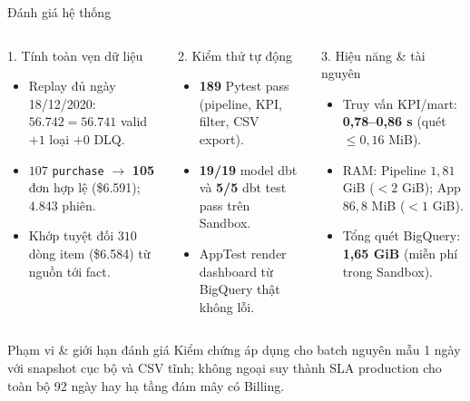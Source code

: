 \documentclass[aspectratio=169]{beamer}
\begin{document}
\begin{frame}{Đánh giá hệ thống}
  \small
  \begin{columns}[T,onlytextwidth]
    \begin{block}{1. Tính toàn vẹn dữ liệu}
      \scriptsize
      \begin{itemize}
        \item Replay đủ ngày 18/12/2020: $56.742 = 56.741$ valid $+ 1$ loại $+ 0$ DLQ.
        \item $107$ \texttt{purchase} $\rightarrow$ \textbf{105} đơn hợp lệ (\$6.591); $4.843$ phiên.
        \item Khớp tuyệt đối $310$ dòng item (\$6.584) từ nguồn tới fact.
      \end{itemize}
    \end{block}

    \begin{block}{2. Kiểm thử tự động}
      \scriptsize
      \begin{itemize}
        \item \textbf{189} Pytest pass (pipeline, KPI, filter, CSV export).
        \item \textbf{19/19} model dbt và \textbf{5/5} dbt test pass trên Sandbox.
        \item AppTest render dashboard từ BigQuery thật không lỗi.
      \end{itemize}
      \vspace{0.15cm}
    \end{block}

    \begin{block}{3. Hiệu năng \& tài nguyên}
      \scriptsize
      \begin{itemize}
        \item Truy vấn KPI/mart: \textbf{0,78--0,86 s} (quét $\le 0{,}16$ MiB).
        \item RAM: Pipeline $1{,}81$ GiB ($<2$ GiB); App $86{,}8$ MiB ($<1$ GiB).
        \item Tổng quét BigQuery: \textbf{1,65 GiB} (miễn phí trong Sandbox).
      \end{itemize}
      \vspace{0.12cm}
    \end{block}
  \end{columns}

  \begin{alertblock}{Phạm vi \& giới hạn đánh giá}
    \scriptsize
    Kiểm chứng áp dụng cho batch nguyên mẫu 1 ngày với snapshot cục bộ và CSV tĩnh; không ngoại suy thành SLA production cho toàn bộ 92 ngày hay hạ tầng đám mây có Billing.
  \end{alertblock}
\end{frame}
\end{document}
